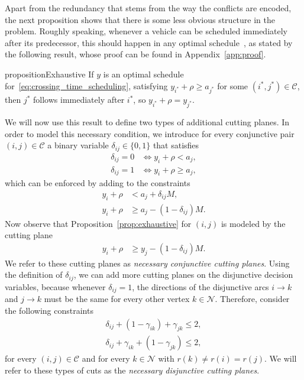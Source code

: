 \documentclass[a4paper]{article}
\theoremstyle{definition}
\theoremstyle{plain}
\begin{document}

Apart from the redundancy that stems from the way the conflicts are encoded, the
next proposition shows that there is some less obvious structure in the problem.
Roughly speaking, whenever a vehicle can be scheduled immediately after its
predecessor, this should happen in any optimal
schedule~\cite{limpensOnlinePlatoonForming2023}, as stated by the following
result, whose proof can be found in Appendix~\ref{app:proof}.

\begin{restatable}{proposition}{Exhaustive}\label{prop:exhaustive}
  If $y$ is an optimal schedule for~\eqref{eq:crossing_time_scheduling},
  satisfying $y_{i^{*}} + \rho \geq a_{j^{*}}$ for some $(i^{*},j^{*}) \in \mathcal{C}$, then $j^{*}$
  follows immediately after $i^{*}$, so $y_{i^{*}} + \rho = y_{j^{*}}$.
\end{restatable}

We will now use this result to define two types of additional cutting planes. In
order to model this necessary condition, we introduce for every conjunctive pair
$(i,j) \in \mathcal{C}$ a binary variable $\delta_{ij} \in \{0, 1\}$ that satisfies
\begin{align*}
  \delta_{ij} = 0 &\iff y_{i} + \rho < a_{j} , \\
  \delta_{ij} = 1 &\iff y_{i} + \rho \geq a_{j} ,
\end{align*}
which can be enforced by adding to the constraints
\begin{align*}
  y_{i} + \rho &< a_{j} + \delta_{ij}M , \\
  y_{i} + \rho &\geq a_{j} - (1 - \delta_{ij}) M .
\end{align*}
Now observe that Proposition~\ref{prop:exhaustive} for $(i,j)$ is modeled by the
cutting plane
\begin{align*}
  y_{i} + \rho &\geq y_{j} - (1 - \delta_{ij}) M .
\end{align*}
We refer to these cutting planes as \textit{necessary conjunctive cutting planes}.
%
Using the definition of $\delta_{ij}$, we can add more cutting planes on the
disjunctive decision variables, because whenever $\delta_{ij} = 1$, the directions of
the disjunctive arcs $i \rightarrow k$ and $j \rightarrow k$ must be the same for every other vertex
$k \in \mathcal{N}$. Therefore, consider the following constraints
\begin{align*}
  \delta_{ij} + (1 - \gamma_{ik}) + \gamma_{jk} \leq 2 , \\
  \delta_{ij} + \gamma_{ik} + (1 - \gamma_{jk}) \leq 2 ,
\end{align*}
for every $(i,j) \in \mathcal{C}$ and for every $k \in \mathcal{N}$ with $r(k) \neq r(i) = r(j)$.
We will refer to these types of cuts as the \textit{necessary disjunctive cutting planes}.
\end{document}
